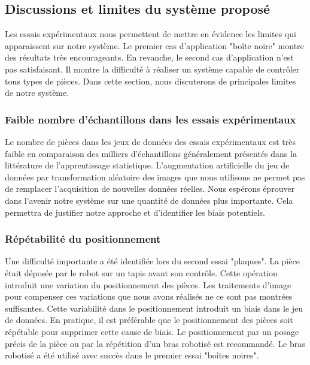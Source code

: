 \subsection{Discussions et limites du système proposé}
Les essais expérimentaux nous permettent de mettre en évidence les limites qui apparaissent sur notre système.
Le premier cas d'application "boîte noire" montre des résultats très encourageants.
En revanche, le second cas d'application n'est pas satisfaisant.
Il montre la difficulté à réaliser un système capable de contrôler tous types de pièces.
Dans cette section, nous discuterons de principales limites de notre système.

\subsubsection{Faible nombre d'échantillons dans les essais expérimentaux}
Le nombre de pièces dans les jeux de données des essais expérimentaux est très faible en comparaison des milliers d’échantillons généralement présentés dans la littérature de l'apprentissage statistique.
L'augmentation artificielle du jeu de données par transformation aléatoire des images que nous utilisons ne permet pas de remplacer l'acquisition de nouvelles données réelles.
Nous espérons éprouver dans l'avenir notre système sur une quantité de données plus importante.
Cela permettra de justifier notre approche et d'identifier les biais potentiels.

\subsubsection{Répétabilité du positionnement}
Une difficulté importante a été identifiée lors du second essai "plaques".
La pièce était déposée par le robot sur un tapis avant son contrôle.
Cette opération introduit une variation du positionnement des pièces.
Les traitements d'image pour compenser ces variations que nous avons réalisés ne ce sont pas montrées suffisantes.
Cette variabilité dans le positionnement introduit un biais dans le jeu de données.
En pratique, il est préférable que le positionnement des pièces soit répétable pour supprimer cette cause de biais.
Le positionnement par un posage précis de la pièce ou par la répétition d'un bras robotisé est recommandé.
Le bras robotisé a été utilisé avec succès dans le premier essai "boîtes noires".


